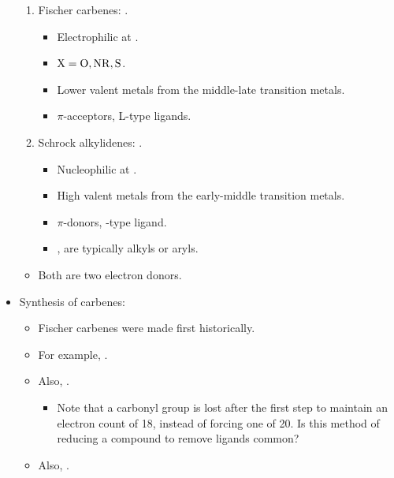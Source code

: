 \documentclass[../notes.tex]{subfiles}
\begin{document}
\begin{itemize}
\begin{figure}[H]
        \label{fig:carbeneResonance}
    \end{figure}
    \begin{enumerate}
        \item Fischer carbenes: .
        \begin{itemize}
            \item Electrophilic at .
            \item $\ce{X}=\ce{O},\ce{NR},\ce{S}$.
            \item Lower valent metals from the middle-late transition metals.
            \item $\pi$-acceptors, L-type ligands.
        \end{itemize}
        \item Schrock alkylidenes: .
        \begin{itemize}
            \item Nucleophilic at .
            \item High valent metals from the early-middle transition metals.
            \item $\pi$-donors, -type ligand.
            \item {}, are typically alkyls or aryls.
        \end{itemize}
    \end{enumerate}
    \begin{itemize}
        \item Both are two electron donors.
    \end{itemize}
    \item Synthesis of carbenes:
    \begin{itemize}
        \item Fischer carbenes were made first historically.
        \item For example, .
        \item Also, .
        \begin{itemize}
            \item Note that a carbonyl group is lost after the first step to maintain an electron count of 18, instead of forcing one of 20. Is this method of reducing a compound to remove ligands common?
        \end{itemize}
        \item Also, .

\end{itemize}
\end{itemize}
\end{document}
